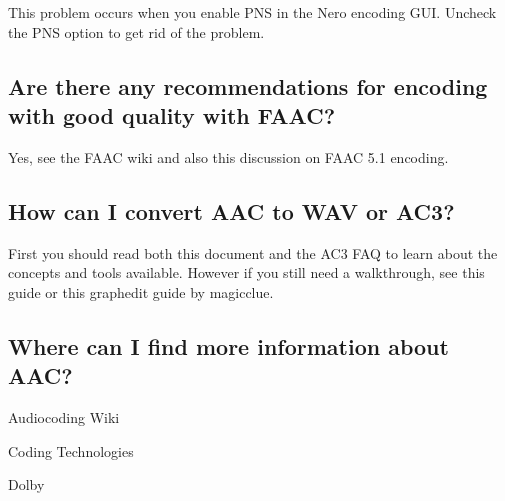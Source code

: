 ﻿\documentclass[12pt]{article}
\begin{document}
This problem occurs when you enable PNS in the Nero encoding GUI. Uncheck the PNS option to get rid
of the problem.

\subsection{Are there any recommendations for encoding with good quality with FAAC?}

Yes, see the FAAC wiki and also this discussion on FAAC 5.1 encoding.

\subsection{How can I convert AAC to WAV or AC3?}

First you should read both this document and the AC3 FAQ to learn about the concepts and tools
available. However if you still need a walkthrough, see this guide or this graphedit guide by
magicclue.

\subsection{Where can I find more information about AAC?}

Audiocoding Wiki

Coding Technologies

Dolby 
\end{document}
